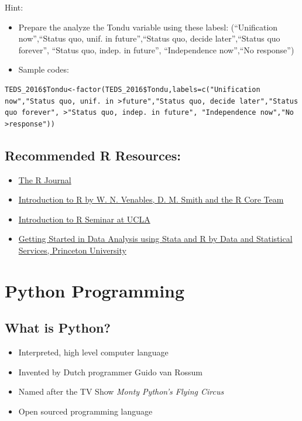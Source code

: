 \documentclass[]{book}
\providecommand{\tightlist}{%
  \setlength{\itemsep}{0pt}\setlength{\parskip}{0pt}}
\begin{document}
Hint:

\begin{itemize}
\tightlist
\item
  Prepare the analyze the Tondu variable using these labesl: (``Unification now'',``Status quo, unif. in future'',``Status quo, decide later'',``Status quo forever'', ``Status quo, indep. in future'', ``Independence now'',``No response'')
\item
  Sample codes:
\end{itemize}

\begin{verbatim}
TEDS_2016$Tondu<-factor(TEDS_2016$Tondu,labels=c("Unification now","Status quo, unif. in >future","Status quo, decide later","Status quo forever", >"Status quo, indep. in future", "Independence now","No >response"))
\end{verbatim}

\hypertarget{recommended-r-resources}{%
\section{Recommended R Resources:}\label{recommended-r-resources}}

\begin{itemize}
\tightlist
\item
  \href{http://journal.r-project.org/}{The R Journal}
\item
  \href{http://cran.r-project.org/doc/manuals/R-intro.pdf}{Introduction to R by W. N. Venables, D. M. Smith and the R Core Team}
\item
  \href{http://www.ats.ucla.edu/stat/r/seminars/intro.htm}{Introduction to R Seminar at UCLA}
\item
  \href{https://dss.princeton.edu/training/}{Getting Started in Data Analysis using Stata and R by Data and Statistical Services, Princeton University}
\end{itemize}

\hypertarget{python-programming}{%
\chapter{Python Programming}\label{python-programming}}

\hypertarget{what-is-python}{%
\section{What is Python?}\label{what-is-python}}

\begin{itemize}
\tightlist
\item
  Interpreted, high level computer language
\item
  Invented by Dutch programmer Guido van Rossum
\item
  Named after the TV Show \emph{Monty Python's Flying Circus}
\item
  Open sourced programming language
\end{itemize}
\end{document}
